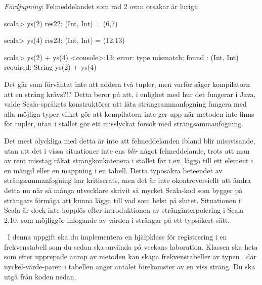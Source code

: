 \SubtaskSolved

\begin{ConceptConnections}
  
\end{ConceptConnections}

\noindent \emph{Fördjupning}:  Felmeddelandet som rad 2 ovan orsakar är lurigt:

\begin{REPL}
scala> ys(2)
res22: (Int, Int) = (6,7)

scala> ys(4)
res23: (Int, Int) = (12,13)

scala> ys(2) + ys(4)
<console>:13: error: type mismatch;
 found   : (Int, Int)
 required: String
       ys(2) + ys(4)

\end{REPL}
Det går som förväntat inte att addera två tupler, men varför säger kompilatorn att en sträng krävs?!? Detta beror på att, i enlighet med hur det fungerar i Java, valde Scala-språkets konstruktörer att låta strängsammanfogning fungera med alla möjliga typer vilket gör att kompilatorn inte ger upp när metoden \code{+} inte finns för tupler, utan i stället gör ett misslyckat försök med strängsammanfogning.

Det mest olyckliga med detta är inte att felmeddelanden ibland blir missvisande, utan att det i vissa situationer inte ens \emph{blir} något felmeddelande, trots att man av rent misstag råkat strängkonkatenera i stället för t.ex. lägga till ett element i en mängd eller en mappning i en tabell. Detta typosäkra beteendet av strängsammanfogning har kritiserats, men det är inte okontroversiellt att ändra detta nu när så många utvecklare skrivit så mycket Scala-kod som bygger på strängars förmåga att kunna lägga till vad som helst på slutet. Situationen i Scala är dock inte hopplös efter introduktionen av stränginterpolering i Scala 2.10, som möjliggör infogande av värden i strängar på ett typsäkert sätt.
\QUESTEND






\QUESTBEGIN

\Task \what~I denna uppgift ska du implementera en hjälpklass för registrering i en frekvenstabell som du sedan ska använda på veckans laboration. Klassen ska heta   som efter upprepade anrop av metoden  kan skapa frekvenstabeller av typen , där nyckel-värde-paren i tabellen anger antalet förekomster av en viss sträng. Du ska utgå från koden nedan.

